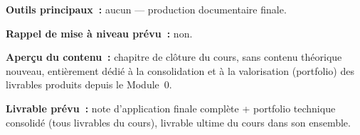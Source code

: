\noindent\textbf{Outils principaux~:} aucun — production documentaire finale.

\noindent\textbf{Rappel de mise à niveau prévu~:} non.

\noindent\textbf{Aperçu du contenu~:} chapitre de clôture du cours, sans contenu théorique nouveau, entièrement dédié à la consolidation et à la valorisation (portfolio) des livrables produits depuis le Module~0.

\noindent\textbf{Livrable prévu~:} note d'application finale complète + portfolio technique consolidé (tous livrables du cours), livrable ultime du cours dans son ensemble.
